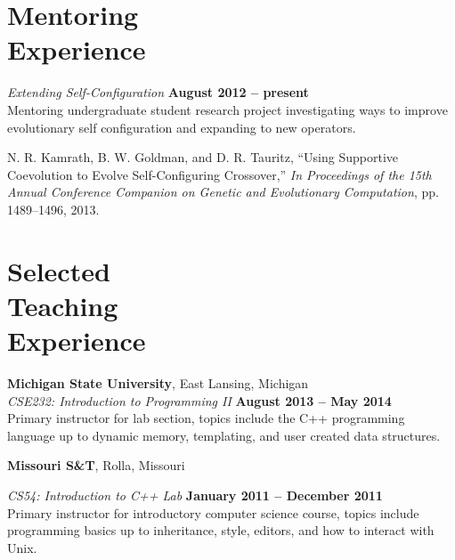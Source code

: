 \documentclass[margin,line]{resume}
\begin{document}
\begin{resume}
    \section{\mysidestyle Mentoring\\Experience}

    \textsl{Extending Self-Configuration} \hfill \textbf{August 2012 -- present}\\
    Mentoring undergraduate student research project investigating ways to improve evolutionary
    self configuration and expanding to new operators.
    
    \vspace{-2mm}
    N. R. Kamrath, B. W. Goldman, and D. R. Tauritz,
    ``Using Supportive Coevolution to Evolve Self-Configuring Crossover,''
    \textsl{In Proceedings of the 15th Annual Conference Companion on Genetic and Evolutionary Computation}, pp. 1489--1496, 2013.

    \section{\mysidestyle Selected\\Teaching\\Experience}
    \textbf{Michigan State University}, East Lansing, Michigan \vspace{2mm}\\\vspace{1mm}%
    \textsl{CSE232: Introduction to Programming II} \hfill \textbf{August 2013 -- May 2014}\\
    Primary instructor for lab section,
    topics include the C++ programming language up to dynamic memory, templating, and user created data structures.

    \textbf{Missouri S\&T}, Rolla, Missouri \vspace{2mm}\\\vspace{1mm}%
    \begin{comment}
    \textsl{CS328: Object Oriented Numerical Methods} \hfill \textbf{January 2012 -- present}\\
    Grader for intensive C++ course,
    topics include advanced programming techniques and how to efficiently solve large systems of equations.
    \end{comment}
    \textsl{CS54: Introduction to C++ Lab} \hfill \textbf{January 2011 -- December 2011}\\
    Primary instructor for introductory computer science course,
    topics include programming basics up to inheritance, style, editors, and how to interact with Unix.
    \begin{comment}
    \textsl{CS387: Parallel Computing} \hfill \textbf{January 2011 -- May 2011}\\
    Teaching assistant for parallel computation course,
    topics include MPI, cluster computing, GPUs, Monte Carlo experiments, and high performance computing.
    \end{comment}
    

\end{resume}
\end{document}
